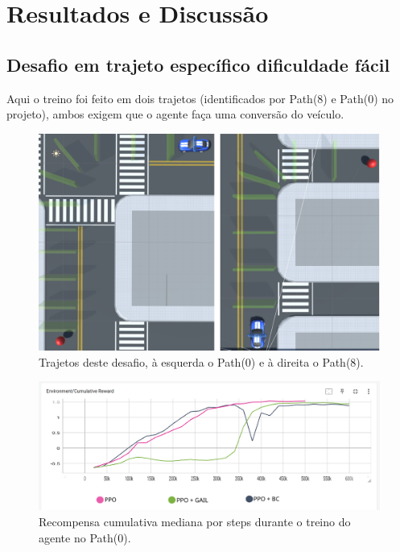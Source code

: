 \chapter{Resultados e Discussão}\label{cap:resultados}

\section{Desafio em trajeto específico dificuldade fácil}
Aqui o treino foi feito em dois trajetos (identificados por Path(8) e Path(0) no projeto), ambos exigem que o agente faça uma conversão do veículo.

\begin{figure}[h]
    \centering
    \includegraphics{figs/treinos/desafio-mediano/paths_0-8.png}
    \caption{Trajetos deste desafio, à esquerda o Path(0) e à direita o Path(8).}
\end{figure}

\begin{figure}[h]
    \centering
    \includegraphics[scale=0.42]{figs/treinos/desafio-mediano/path0/recompensa-ppo-bc-gail-path0.png}
    \caption{Recompensa cumulativa mediana por steps durante o treino do agente no Path(0).}
\end{figure}

